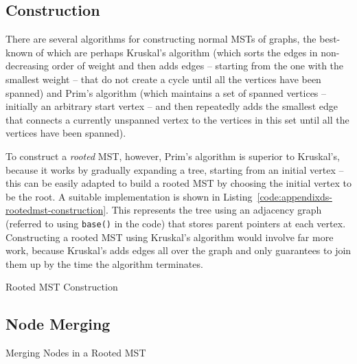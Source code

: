 \subsection{Construction}

There are several algorithms for constructing normal MSTs of graphs, the best-known of which are perhaps Kruskal's algorithm (which sorts the edges in non-decreasing order of weight and then adds edges -- starting from the one with the smallest weight -- that do not create a cycle until all the vertices have been spanned) and Prim's algorithm (which maintains a set of spanned vertices -- initially an arbitrary start vertex -- and then repeatedly adds the smallest edge that connects a currently unspanned vertex to the vertices in this set until all the vertices have been spanned).

To construct a \emph{rooted} MST, however, Prim's algorithm is superior to Kruskal's, because it works by gradually expanding a tree, starting from an initial vertex -- this can be easily adapted to build a rooted MST by choosing the initial vertex to be the root. A suitable implementation is shown in Listing~\ref{code:appendixds-rootedmst-construction}. This represents the tree using an adjacency graph (referred to using \texttt{base()} in the code) that stores parent pointers at each vertex. Constructing a rooted MST using Kruskal's algorithm would involve far more work, because Kruskal's adds edges all over the graph and only guarantees to join them up by the time the algorithm terminates.

\begin{stulisting}[p]
\caption{Rooted MST Construction}
\label{code:appendixds-rootedmst-construction}

\end{stulisting}

\subsection{Node Merging}

\begin{stulisting}[p]
\caption{Merging Nodes in a Rooted MST}
\label{code:appendixds-rootedmst-mergenodes}

\end{stulisting}

